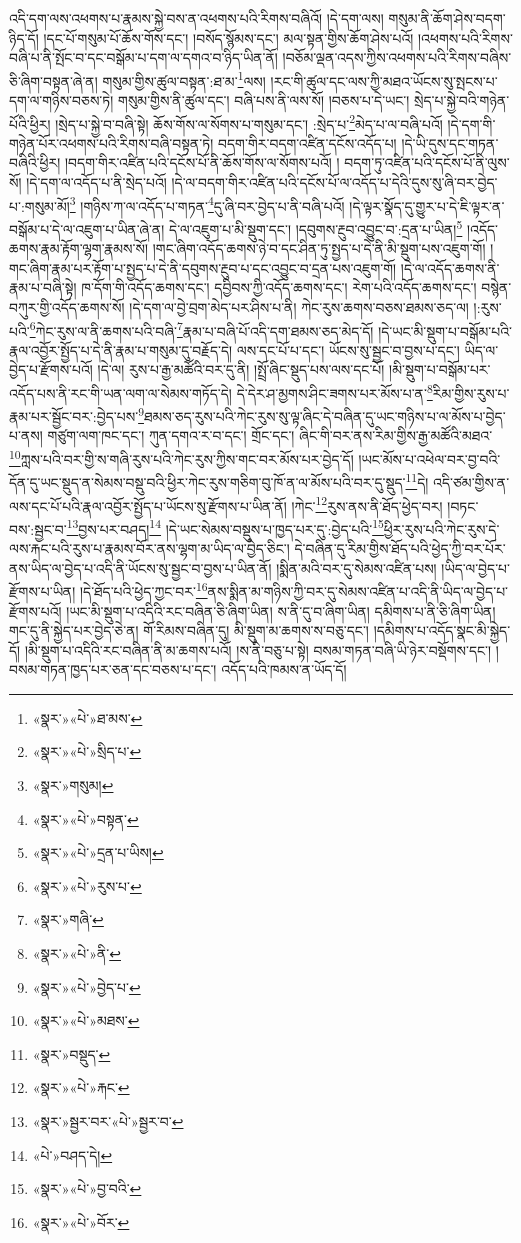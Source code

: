 འདི་དག་ལས་འཕགས་པ་རྣམས་སྐྱེ་བས་ན་འཕགས་པའི་རིགས་བཞིའོ། །དེ་དག་ལས། གསུམ་ནི་ཆོག་ཤེས་བདག་ཉིད་དོ། །དང་པོ་གསུམ་པོ་ཆོས་གོས་དང་། །བསོད་སྙོམས་དང་། མལ་སྟན་གྱིས་ཆོག་ཤེས་པའོ། །འཕགས་པའི་རིགས་བཞི་པ་ནི་སྤོང་བ་དང་བསྒོམ་པ་དག་ལ་དགའ་བ་ཉིད་ཡིན་ནོ། །བཅོམ་ལྡན་འདས་ཀྱིས་འཕགས་པའི་རིགས་བཞིས་ཅི་ཞིག་བསྟན་ཞེ་ན། གསུམ་གྱིས་ཚུལ་བསྟན་:ཐ་མ་\footnote{«སྣར་»«པེ་»ཐ་མས་}ལས། །རང་གི་ཚུལ་དང་ལས་ཀྱི་མཐའ་ཡོངས་སུ་སྤངས་པ་དག་ལ་གཉིས་བཅས་ཏེ། གསུམ་གྱིས་ནི་ཚུལ་དང་། བཞི་པས་ནི་ལས་སོ། །བཅས་པ་དེ་ཡང་། སྲེད་པ་སྐྱེ་བའི་གཉེན་པོའི་ཕྱིར། །སྲེད་པ་སྐྱེ་བ་བཞི་སྟེ། ཆོས་གོས་ལ་སོགས་པ་གསུམ་དང་། :སྲེད་པ་\footnote{«སྣར་»«པེ་»སྲིད་པ་}མེད་པ་ལ་བཞི་པའོ། །དེ་དག་གི་གཉེན་པོར་འཕགས་པའི་རིགས་བཞི་བསྟན་ཏེ། བདག་གིར་བདག་འཛིན་དངོས་འདོད་པ། །དེ་ཡི་དུས་དང་གཏན་བཞིའི་ཕྱིར། །བདག་གིར་འཛིན་པའི་དངོས་པོ་ནི་ཆོས་གོས་ལ་སོགས་པའོ། །
བདག་ཏུ་འཛིན་པའི་དངོས་པོ་ནི་ལུས་སོ། །དེ་དག་ལ་འདོད་པ་ནི་སྲེད་པའོ། །དེ་ལ་བདག་གིར་འཛིན་པའི་དངོས་པོ་ལ་འདོད་པ་དེའི་དུས་སུ་ཞི་བར་བྱེད་པ་:གསུམ་མོ།\footnote{«སྣར་»གསུམ།} །གཉིས་ཀ་ལ་འདོད་པ་གཏན་\footnote{«སྣར་»«པེ་»བསྟན་}དུ་ཞི་བར་བྱེད་པ་ནི་བཞི་པའོ། །དེ་ལྟར་སྣོད་དུ་གྱུར་པ་དེ་ཇི་ལྟར་ན་བསྒོམ་པ་དེ་ལ་འཇུག་པ་ཡིན་ཞེ་ན། དེ་ལ་འཇུག་པ་མི་སྡུག་དང་། །དབུགས་རྔུབ་འབྱུང་བ་:དྲན་པ་ཡིན།\footnote{«སྣར་»«པེ་»དྲན་པ་ཡིས།} །འདོད་ཆགས་རྣམ་རྟོག་ལྷག་རྣམས་སོ། །གང་ཞིག་འདོད་ཆགས་ཉེ་བ་དང་ཤིན་ཏུ་སྤྱད་པ་དེ་ནི་མི་སྡུག་པས་འཇུག་གོ། །གང་ཞིག་རྣམ་པར་རྟོག་པ་སྤྱད་པ་དེ་ནི་དབུགས་རྔུབ་པ་དང་འབྱུང་བ་དྲན་པས་འཇུག་གོ། །དེ་ལ་འདོད་ཆགས་ནི་རྣམ་པ་བཞི་སྟེ། ཁ་དོག་གི་འདོད་ཆགས་དང་། དབྱིབས་ཀྱི་འདོད་ཆགས་དང་། རེག་པའི་འདོད་ཆགས་དང་། བསྙེན་བཀུར་གྱི་འདོད་ཆགས་སོ། །དེ་དག་ལ་བྱེ་བྲག་མེད་པར་ཤིས་པ་ནི། ཀེང་རུས་ཆགས་བཅས་ཐམས་ཅད་ལ། །:རུས་པའི་\footnote{«སྣར་»«པེ་»རུས་པ་}ཀེང་རུས་ལ་ནི་ཆགས་པའི་བཞི་\footnote{«སྣར་»གཞི་}རྣམ་པ་བཞི་པོ་འདི་དག་ཐམས་ཅད་མེད་དོ། །དེ་ཡང་མི་སྡུག་པ་བསྒོམ་པའི་རྣལ་འབྱོར་སྤྱོད་པ་དེ་ནི་རྣམ་པ་གསུམ་དུ་བརྗོད་དེ། ལས་དང་པོ་པ་དང་། ཡོངས་སུ་སྦྱང་བ་བྱས་པ་དང་། ཡིད་ལ་བྱེད་པ་རྫོགས་པའོ། །དེ་ལ། རུས་པ་རྒྱ་མཚོའི་བར་དུ་ནི། །སྤྲོ་ཞིང་སྡུད་པས་ལས་དང་པོ། །མི་སྡུག་པ་བསྒོམ་པར་འདོད་པས་ནི་རང་གི་ཡན་ལག་ལ་སེམས་གཏོད་དེ། དེ་དེར་ཤ་མྱགས་ཤིང་ཟགས་པར་མོས་པ་ན་\footnote{«སྣར་»«པེ་»ནི་}རིམ་གྱིས་རུས་པ་རྣམ་པར་སྦྱོང་བར་:བྱེད་པས་\footnote{«སྣར་»«པེ་»བྱེད་པ་}ཐམས་ཅད་རུས་པའི་ཀེང་རུས་སུ་ལྟ་ཞིང་དེ་བཞིན་དུ་ཡང་གཉིས་པ་ལ་མོས་པ་བྱེད་པ་ནས། གཙུག་ལག་ཁང་དང་། ཀུན་དགའ་ར་བ་དང་། གྲོང་དང་། ཞིང་གི་བར་ནས་རིམ་གྱིས་རྒྱ་མཚོའི་མཐའ་\footnote{«སྣར་»«པེ་»མཐས་}ཀླས་པའི་བར་གྱི་ས་གཞི་རུས་པའི་ཀེང་རུས་ཀྱིས་གང་བར་མོས་པར་བྱེད་དོ། །ཡང་མོས་པ་འཕེལ་བར་བྱ་བའི་དོན་དུ་ཡང་སྡུད་ན་སེམས་བསྡུ་བའི་ཕྱིར་ཀེང་རུས་གཅིག་བུ་ཁོ་ན་ལ་མོས་པའི་བར་དུ་སྡུད་\footnote{«སྣར་»བསྡུད་}དེ། འདི་ཙམ་གྱིས་ན་ལས་དང་པོ་པའི་རྣལ་འབྱོར་སྤྱོད་པ་ཡོངས་སུ་རྫོགས་པ་ཡིན་ནོ། །ཀེང་\footnote{«སྣར་»«པེ་»རྐང་}རུས་ནས་ནི་ཐོད་ཕྱེད་བར། །བཏང་བས་:སྦྱང་བ་\footnote{«སྣར་»སྦྱར་བར་«པེ་»སྦྱར་བ་}བྱས་པར་བཤད།\footnote{«པེ་»བཤད་དེ།} །དེ་ཡང་སེམས་བསྡུས་པ་ཁྱད་པར་དུ་:བྱེད་པའི་\footnote{«སྣར་»«པེ་»བྱ་བའི་}ཕྱིར་རུས་པའི་ཀེང་རུས་དེ་ལས་རྐང་པའི་རུས་པ་རྣམས་བོར་ནས་ལྷག་མ་ཡིད་ལ་བྱེད་ཅིང་། དེ་བཞིན་དུ་རིམ་གྱིས་ཐོད་པའི་ཕྱེད་ཀྱི་བར་པོར་ནས་ཡིད་ལ་བྱེད་པ་འདི་ནི་ཡོངས་སུ་སྦྱང་བ་བྱས་པ་ཡིན་ནོ། །སྨིན་མའི་བར་དུ་སེམས་འཛིན་པས། །ཡིད་ལ་བྱེད་པ་རྫོགས་པ་ཡིན། །དེ་ཐོད་པའི་ཕྱེད་ཀྱང་བར་\footnote{«སྣར་»«པེ་»བོར་}ནས་སྨིན་མ་གཉིས་ཀྱི་བར་དུ་སེམས་འཛིན་པ་འདི་ནི་ཡིད་ལ་བྱེད་པ་རྫོགས་པའོ། །ཡང་མི་སྡུག་པ་འདིའི་རང་བཞིན་ཅི་ཞིག་ཡིན། ས་ནི་དུ་བ་ཞིག་ཡིན། དམིགས་པ་ནི་ཅི་ཞིག་ཡིན། གང་དུ་ནི་སྐྱེད་པར་བྱེད་ཅེ་ན། གོ་རིམས་བཞིན་དུ། མི་སྡུག་མ་ཆགས་ས་བཅུ་དང་། །དམིགས་པ་འདོད་སྣང་མི་སྐྱེད་དོ། །མི་སྡུག་པ་འདིའི་རང་བཞིན་ནི་མ་ཆགས་པའོ། །ས་ནི་བཅུ་པ་སྟེ། བསམ་གཏན་བཞི་ཡི་ཉེར་བསྡོགས་དང་། །བསམ་གཏན་ཁྱད་པར་ཅན་དང་བཅས་པ་དང་། འདོད་པའི་ཁམས་ན་ཡོད་དོ། 